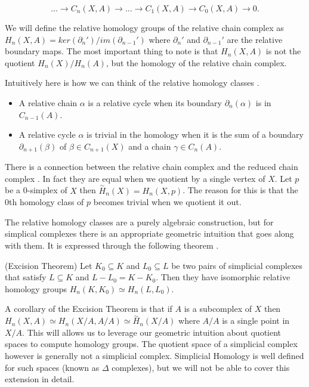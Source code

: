 $$ ... \longrightarrow C_n(X, A) \longrightarrow ... \longrightarrow C_1(X, A) \longrightarrow C_0(X, A) \longrightarrow 0. $$

We will define the relative homology groups of the relative chain complex as $H_n(X, A) = ker(\partial_n') / im(\partial_{n-1}')$ where $\partial_n'$ and $\partial_{n-1}'$ are the relative boundary maps. The most important thing to note is that $H_n(X, A)$ is not the quotient $H_n(X) / H_n(A)$, but the homology of the relative chain complex.

Intuitively here is how we can think of the relative homology classes \cite{algebraic-topology}.

\begin{itemize}
  \item A relative chain $\alpha$ is a relative cycle when its boundary $\partial_n(\alpha)$ is in $C_{n-1}(A)$.
  \item A relative cycle $\alpha$ is trivial in the homology when it is the sum of a boundary $\partial_{n + 1}(\beta)$ of $\beta \in C_{n+1}(X)$ and a chain $\gamma \in C_n(A)$.
\end{itemize}

There is a connection between the relative chain complex and the reduced chain complex \cite{elementary-applied-topology}. In fact they are equal when we quotient by a single vertex of $X$. Let $p$ be a 0-simplex of $X$ then $\overset{\sim}{H}_n(X) = H_n(X, p)$. The reason for this is that the 0th homology class of $p$ becomes trivial when we quotient it out.

The relative homology classes are a purely algebraic construction, but for simplical complexes there is an appropriate geometric intuition that goes along with them. It is expressed through the following theorem \cite{comp-topo}.

\begin{thm} (Excision Theorem)
  Let $K_0 \subseteq K$ and $L_0 \subseteq L$ be two pairs of simplicial complexes that satisfy $L \subseteq K$ and $L - L_0 = K - K_0$. Then they have isomorphic relative homology groups $H_n(K, K_0) \simeq H_n(L, L_0)$.
\end{thm}

A corollary of the Excision Theorem \cite{elementary-applied-topology} is that if $A$ is a subcomplex of $X$ then $H_n(X, A) \simeq H_n(X/A, A/A) \simeq \overset{\sim}{H}_n(X/A)$ where $A/A$ is a single point in $X/A$. This will allows us to leverage our geometric intuition about quotient spaces to compute homology groups. The quotient space of a simplicial complex however is generally not a simplicial complex. Simplicial Homology is well defined for such spaces (known as $\Delta$ complexes), but we will not be able to cover this extension in detail.

